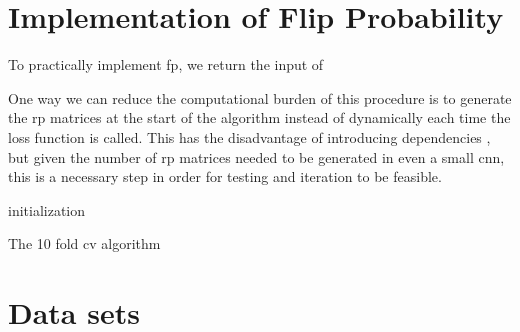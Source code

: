 
\begin{equation}
\label{eq:cosine_loss}
\end{equation}



\section{Implementation of Flip Probability}

To practically implement \gls{fp}, we return the input of



One way we can reduce the computational burden of this procedure is to generate the \gls{rp} matrices at the start of the algorithm instead of dynamically each time the loss function is called. This has the disadvantage of introducing dependencies \cite{bob_rp_storage}, but given the number of \gls{rp} matrices needed to be generated in even a small \gls{cnn}, this is a necessary step in order for testing and iteration to be feasible. 
\bigskip

\begin{algorithm}[H]
\SetAlgoLined
{}
 initialization\;
    \caption{The 10 fold \gls{cv} algorithm}
    \label{algo:fp_python_1}
\end{algorithm}


\section{Data sets}
 
%

